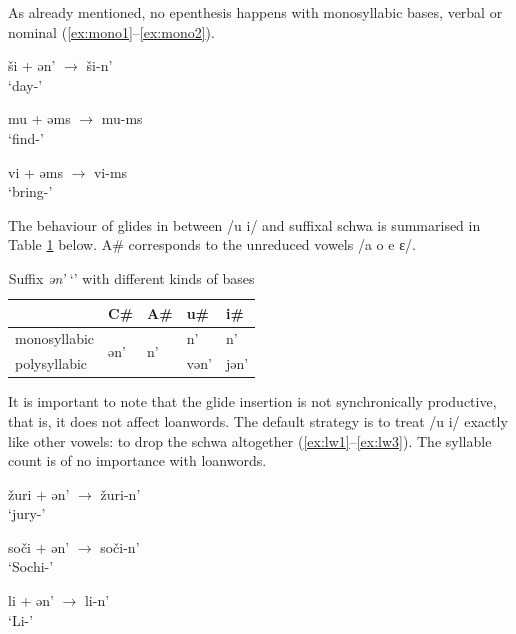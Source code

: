\documentclass[a4paper, 12pt]{article}
\begin{document}
	\noindent As already mentioned, no epenthesis happens with monosyllabic bases, verbal or nominal (\ref{ex:mono1}--\ref{ex:mono2}).
	
\begin{minipage}[t]{.3\linewidth}
\ex\label{ex:mono1}
	ši + ən' $\rightarrow$ ši-n' \\`day-{\Gen}'
\xe
\end{minipage}
\hfill
\begin{minipage}[t]{.3\linewidth}
\ex\label{ex:}
	mu + əms $\rightarrow$ mu-ms \\`find-{\Inf}'
\xe
\end{minipage}	
\hfill
\begin{minipage}[t]{.3\linewidth}
\ex\label{ex:mono2}
	vi + əms $\rightarrow$ vi-ms \\`bring-{\Inf}'
\xe
\end{minipage}
	
	\noindent The behaviour of glides in between /u i/ and suffixal schwa is summarised in Table \ref{tab:glidesschwa} below. A\# corresponds to the unreduced vowels /a o e ɛ/.
	
\begin{table}[H]
\centering
\begin{tabular}{lllll}
\toprule
               & C\#                  & A\#                 & u\#  & i\#  \\
\midrule
monosyllabic      & \multirow{2}{*}{ən'} & \multirow{2}{*}{n'} & n'   & n'   \\
polysyllabic &                      &                     & vən' & jən'\\
\bottomrule
\end{tabular}
\caption{Suffix \emph{ən'} `{\Gen}' with different kinds of bases}
\label{tab:glidesschwa}
\end{table}
	
	\noindent It is important to note that the glide insertion is not synchronically productive, that is, it does not affect loanwords. The default strategy is to treat /u i/ exactly like other vowels: to drop the schwa altogether (\ref{ex:lw1}--\ref{ex:lw3}). The syllable count is of no importance with loanwords. 
	
\begin{minipage}[t]{.3\linewidth}
\ex\label{ex:lw1}
	žuri + ən' $\rightarrow$ žuri-n' \\`jury-{\Gen}'
\xe
\end{minipage}
\hfill
\begin{minipage}[t]{.3\linewidth}
\ex\label{ex:lw2}
	soči + ən' $\rightarrow$ soči-n' \\ `Sochi-{\Gen}' 
\xe
\end{minipage}	
\hfill
\begin{minipage}[t]{.3\linewidth}
\ex\label{ex:lw3}
	li + ən' $\rightarrow$ li-n' \\ `Li-{\Gen}'
\xe
\end{minipage}
	
\end{document}

